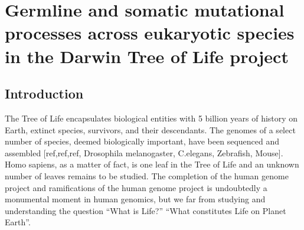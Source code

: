 \chapter{Germline and somatic mutational processes across eukaryotic species in the Darwin Tree of Life project}

\ifpdf
    \graphicspath{{Chapter3/Figs/Raster/}{Chapter3/Figs/PDF/}{Chapter3/Figs/}}
\else
    \graphicspath{{Chapter3/Figs/Vector/}{Chapter3/Figs/}}
\fi


\section{Introduction}

The Tree of Life encapsulates biological entities with 5 billion years of history on Earth, extinct species, survivors, and their descendants. The genomes of a select number of species, deemed biologically important, have been sequenced and assembled [ref,ref,ref, Drosophila melanogaster, C.elegans, Zebrafish, Mouse].  Homo sapiens, as a matter of fact, is one leaf in the Tree of Life and an unknown number of leaves remains to be studied. The completion of the human genome project and ramifications of the human genome project is undoubtedly a monumental moment in human genomics, but we far from studying and understanding the question “What is Life?” “What constitutes Life on Planet Earth”.


